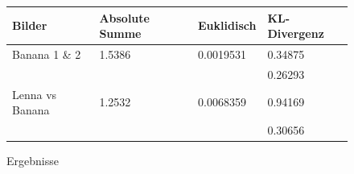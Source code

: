 \begin{figure}[H]
\begin{center}
\begin{tabular}[h]{|l|lll|}
\hline
Bilder          & Absolute Summe & Euklidisch & KL-Divergenz \\
\hline
Banana 1 \& 2   & 1.5386 & 0.0019531 & 0.34875 \\
                &          &         & 0.26293 \\
Lenna vs Banana & 1.2532 & 0.0068359 & 0.94169 \\ 
                &          &         & 0.30656 \\
\hline
\end{tabular}
\end{center}
\label{hops}
\caption{Ergebnisse}
\end{figure}


